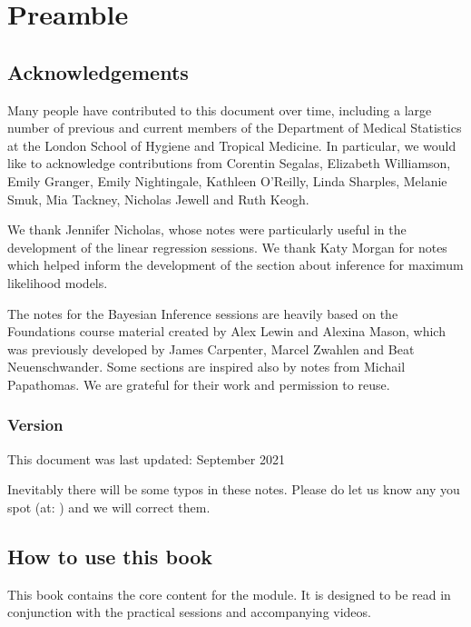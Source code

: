 \documentclass[letterpaper,10pt,english]{jupyterBook}
\begin{document}
\part{Preamble}


\chapter{Acknowledgements}
\label{\detokenize{00. Acknowledgements:acknowledgements}}\label{\detokenize{00. Acknowledgements::doc}}
\sphinxAtStartPar
Many people have contributed to this document over time, including a large number of previous and current members of the Department of Medical Statistics at the London School of Hygiene and Tropical Medicine. In particular, we would like to acknowledge contributions from Corentin Segalas, Elizabeth Williamson, Emily Granger, Emily Nightingale, Kathleen O’Reilly, Linda Sharples, Melanie Smuk, Mia Tackney, Nicholas Jewell and Ruth Keogh.

\sphinxAtStartPar
We thank Jennifer Nicholas, whose notes  were particularly useful in the development of the linear regression sessions.  We thank Katy Morgan for notes which helped inform the development of the section about inference for maximum likelihood models.

\sphinxAtStartPar
The notes for the Bayesian Inference sessions are heavily based on the Foundations course material created by Alex Lewin and Alexina Mason, which was previously developed by James Carpenter, Marcel Zwahlen and Beat Neuenschwander. Some sections are inspired also by notes from Michail Papathomas. We are grateful for their work and permission to re\sphinxhyphen{}use.


\section{Version}
\label{\detokenize{00. Acknowledgements:version}}
\sphinxAtStartPar
This document was last updated: September 2021

\sphinxAtStartPar
Inevitably there will be some typos in these notes. Please do let us know any you spot (at: ) and we will correct them.


\chapter{How to use this book}
\label{\detokenize{00. How_to_use:how-to-use-this-book}}\label{\detokenize{00. How_to_use::doc}}
\sphinxAtStartPar
This book contains the core content for the module. It is designed to be read in conjunction with the practical sessions and accompanying videos.
\end{document}
